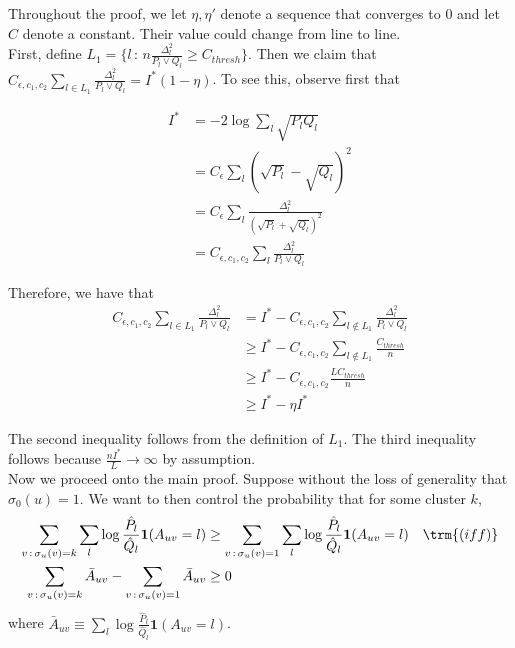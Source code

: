 \documentclass{article}
\begin{document}
Throughout the proof, we let $\eta, \eta'$ denote a sequence that converges to 0 and let $C$ denote a constant. Their value could change from line to line. \\

First, define $L_1 = \{ l \,:\, n \frac{\Delta_l^2}{P_l \vee Q_l} \geq C_{thresh} \}$. Then we claim that $C_{\epsilon, c_1, c_2} \sum_{l \in L_1} \frac{\Delta_l^2}{P_l \vee Q_l} = I^*( 1 - \eta )$. To see this, observe first that

\begin{align*}
I^* &= -2 \log \sum_l \sqrt{P_l Q_l} \\
  &= C_\epsilon \sum_l (\sqrt{P_l} - \sqrt{Q_l} )^2 \\
  &= C_\epsilon \sum_l \frac{\Delta_l^2}{(\sqrt{P_l} + \sqrt{Q_l})^2} \\
  &= C_{\epsilon, c_1, c_2} \sum_l \frac{\Delta_l^2}{P_l \vee Q_l} 
\end{align*}

Therefore, we have that
\begin{align*}
C_{\epsilon, c_1, c_2} \sum_{l \in L_1} \frac{\Delta_l^2}{P_l \vee Q_l} &= I^* - 
 C_{\epsilon, c_1, c_2} \sum_{l \notin L_1} \frac{\Delta_l^2}{P_l \vee Q_l} \\
 &\geq I^* - C_{\epsilon, c_1, c_2} \sum_{l \notin L_1} \frac{C_{thresh}}{n} \\
 &\geq I^* - C_{\epsilon, c_1, c_2} \frac{ L C_{thresh}}{n} \\
 &\geq I^* - \eta I^* 
\end{align*}

The second inequality follows from the definition of $L_1$. The third inequality follows because $\frac{n I^*}{L} \rightarrow \infty$ by assumption. \\


Now we proceed onto the main proof. Suppose without the loss of generality that $\sigma_0(u) = 1$.  We want to then control the probability that for some cluster $k$, 
\begin{align}
\sum_{v\,:\, \sigma_u(v)=k} \sum_l \log \frac{\hat{P}_l}{\hat{Q}_l} \mathbf{1}(A_{uv} = l) 
&\geq 
 \sum_{v\,:\, \sigma_u(v)=1} \sum_l \log \frac{\hat{P}_l}{\hat{Q}_l} \mathbf{1}(A_{uv} = l) 
  \quad \trm{(iff)}  \nonumber \\
\sum_{v \,:\, \sigma_u(v) = k} \bar{A}_{uv} - \sum_{v\,:\, \sigma_u(v) = 1} \bar{A}_{uv} 
\label{eqn:bad_event1}
&\geq 0 
\end{align}
where $\bar{A}_{uv} \equiv \sum_l \log \frac{\hat{P}_l}{\hat{Q}_l} \mathbf{1}(A_{uv} = l)$.
\end{document}
